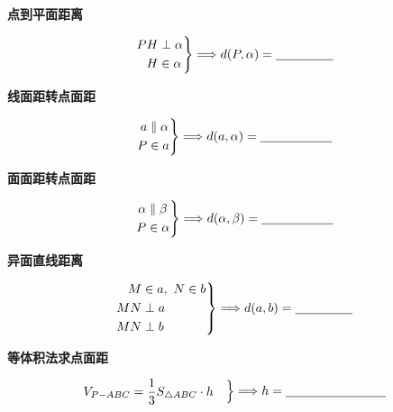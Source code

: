 \documentclass{exam-zh}
\begin{document}
\begin{question}[points=5]
  \textbf{点到平面距离}\par
\[
\left.
\begin{aligned}
PH&\perp\alpha\\
H&\in\alpha
\end{aligned}
\right\}
\Longrightarrow
d(P,\alpha)=\underline{\hspace{16mm}}
\]


\end{question}



\begin{question}[points=5]
  \textbf{线面距转点面距}\par
\[
\left.
\begin{aligned}
a&\parallel\alpha\\
P&\in a
\end{aligned}
\right\}
\Longrightarrow
d(a,\alpha)=\underline{\hspace{20mm}}
\]


\end{question}



\begin{question}[points=5]
  \textbf{面面距转点面距}\par
\[
\left.
\begin{aligned}
\alpha&\parallel\beta\\
P&\in\alpha
\end{aligned}
\right\}
\Longrightarrow
d(\alpha,\beta)=\underline{\hspace{20mm}}
\]


\end{question}



\begin{question}[points=5]
  \textbf{异面直线距离}\par
\[
\left.
\begin{aligned}
M&\in a,\ N\in b\\
MN&\perp a\\
MN&\perp b
\end{aligned}
\right\}
\Longrightarrow
d(a,b)=\underline{\hspace{16mm}}
\]


\end{question}



\begin{question}[points=5]
  \textbf{等体积法求点面距}\par
\[
\left.
\begin{aligned}
V_{P-ABC}&=\frac13 S_{\triangle ABC}\cdot h
\end{aligned}
\right\}
\Longrightarrow
h=\underline{\hspace{28mm}}
\]


\end{question}
\end{document}

